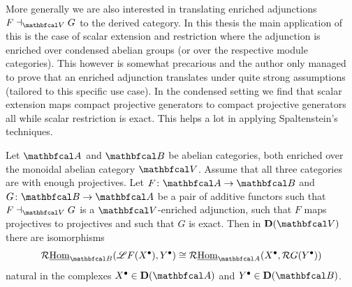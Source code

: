 More generally we are also interested in translating enriched adjunctions $F\ladj_\category{V} G$ to the derived category. In this thesis the main application of this is the case of scalar extension and restriction where the adjunction is enriched over condensed abelian groups (or over the respective module categories). This however is somewhat precarious and the author only managed to prove that an enriched adjunction translates under quite strong assumptions (tailored to this specific use case). In the condensed setting we find that scalar extension maps compact projective generators to compact projective generators all while scalar restriction is exact. This helps a lot in applying Spaltenstein's techniques.
\begin{lemma}
	\label{lemma: enriched adjunctions are stable under derivation}
	
	Let $\category{A}$ and $\category{B}$ be abelian categories, both enriched over the monoidal abelian category $\category{V}$. Assume that all three categories are  with enough projectives. Let $F\colon \category{A} \to \category{B}$ and $G\colon \category{B}\to\category{A}$ be a pair of additive functors such that $F\ladj_\category{V} G$ is a $\category{V}$-enriched adjunction, such that $F$ maps projectives to projectives and such that $G$ is exact. Then in $\derived{\category{V}}$ there are isomorphisms
	$$\eRHom_\category{B}(\LeftD F(X^\bullet), Y^\bullet) \cong \eRHom_\category{A}(X^\bullet, \RightD G(Y^\bullet))$$
	natural in the complexes $X^\bullet \in \derived{\category{A}}$ and $Y^\bullet \in \derived{\category{B}}$.
\end{lemma}
